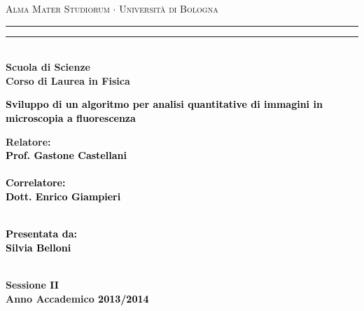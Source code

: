 \documentclass[12pt,a4paper]{report}
\begin{document}
\begin{titlepage}

%
%
%
\begin{center}
{{\Large{\textsc{Alma Mater Studiorum $\cdot$ Universit\`a di Bologna}}}} 
\rule[0.1cm]{15.8cm}{0.1mm}
\rule[0.5cm]{15.8cm}{0.6mm}
\\\vspace{3mm}
%
%
{\small{\bf Scuola di Scienze \\ Corso di Laurea in Fisica}}

\end{center}

\vspace{23mm}

\begin{center}\textcolor{black}{
%
%
%
{\LARGE{\bf Sviluppo di un algoritmo per analisi quantitative di immagini in microscopia a fluorescenza}}\\
}\end{center}

\vspace{50mm} \par \noindent

\begin{minipage}[t]{0.47\textwidth}
%
%
{\large{\bf Relatore: \vspace{2mm}\\\textcolor{black}{
Prof. Gastone Castellani}\\\\
%
%
%
\textcolor{black}{
\bf Correlatore:
\vspace{2mm}\\
Dott. Enrico Giampieri \\\\}}}
\end{minipage}
%
\hfill
%
\begin{minipage}[t]{0.47\textwidth}\raggedleft \textcolor{black}{
{\large{\bf Presentata da:
\vspace{2mm}\\
Silvia Belloni \\\\}}}
\end{minipage}

\vspace{17mm}

\begin{center}
%
%
{\large{\bf Sessione \textcolor{black}{II }
\vspace{2mm}\\
%
%
Anno Accademico \textcolor{black}{ 2013/2014}}}
\end{center}

\end{titlepage}
\end{document}
